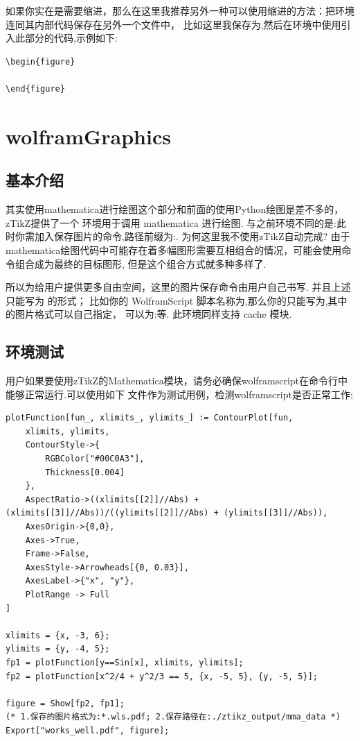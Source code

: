 如果你实在是需要缩进，那么在这里我推荐另外一种可以使用缩进的方法：把环境连同其内部代码保存在另外一个文件中，
比如这里我保存为,然后在环境中使用\cmd[F]{}引入此部分的代码,示例如下:
\begin{verbatim}
\begin{figure}
  
\end{figure}
\end{verbatim}


\section{wolframGraphics}
\subsection{基本介绍}
其实使用mathematica进行绘图这个部分和前面的使用Python绘图是差不多的，zTikZ提供了一个
环境用于调用 mathematica 进行绘图. 与之前环境不同的是:此时你需加入保存图片的命令,路径前缀为:. 
为何这里我不使用zTikZ自动完成? 由于mathematica绘图代码中可能存在着多幅图形需要互相组合的情况，可能会使用命令组合成为最终的目标图形, 
但是这个组合方式就多种多样了.

所以为给用户提供更多自由空间，这里的图片保存命令由用户自己书写. 并且上述只能写为 的形式；
比如你的 WolframScript 脚本名称为,那么你的只能写为,其中的图片格式可以自己指定，
可以为:等. 此环境同样支持 cache 模块.


\subsection{环境测试}
用户如果要使用zTikZ的Mathematica模块，请务必确保wolframscript在命令行中能够正常运行.可以使用如下
文件作为测试用例，检测wolframscript是否正常工作; 
\begin{verbatim}
plotFunction[fun_, xlimits_, ylimits_] := ContourPlot[fun, 
    xlimits, ylimits,
    ContourStyle->{
        RGBColor["#00C0A3"], 
        Thickness[0.004]
    },
    AspectRatio->((xlimits[[2]]//Abs) + (xlimits[[3]]//Abs))/((ylimits[[2]]//Abs) + (ylimits[[3]]//Abs)), 
    AxesOrigin->{0,0}, 
    Axes->True,
    Frame->False,
    AxesStyle->Arrowheads[{0, 0.03}],
    AxesLabel->{"x", "y"},
    PlotRange -> Full
]

xlimits = {x, -3, 6};
ylimits = {y, -4, 5};
fp1 = plotFunction[y==Sin[x], xlimits, ylimits];
fp2 = plotFunction[x^2/4 + y^2/3 == 5, {x, -5, 5}, {y, -5, 5}];

figure = Show[fp2, fp1];
(* 1.保存的图片格式为:*.wls.pdf; 2.保存路径在:./ztikz_output/mma_data *)
Export["works_well.pdf", figure];
\end{verbatim}

